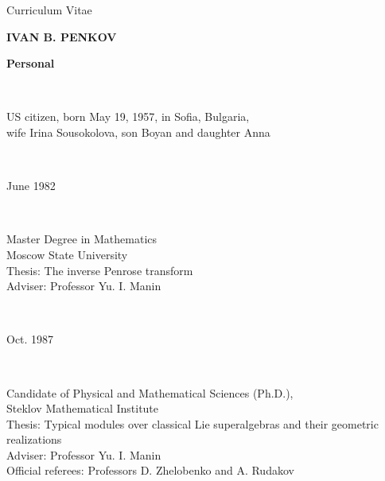 \documentclass[11pt]{amsart}
\newcommand{\thc}[2]{\noindent\parbox[t]{40mm}{#1}\
\parbox[t]{105mm}{#2}\\
}
\begin{document}
\begin{center}
Curriculum Vitae

\medskip

{\large{\bf IVAN B. PENKOV}}
\end{center}

\bigskip

\thc{\bf Personal}{US citizen, born May 19, 1957, in Sofia,
Bulgaria,\\ wife Irina Sousokolova, son Boyan and daughter Anna}

\medskip


\medskip

\thc{June 1982}{Master Degree in Mathematics\\
Moscow State University \\ Thesis:  The inverse Penrose
transform\\
Adviser:  Professor Yu. I. Manin\\}
\thc{Oct. 1987}{Candidate of Physical and Mathematical Sciences (Ph.D.),\\
Steklov Mathematical Institute\\
Thesis:  Typical modules over classical Lie superalgebras and their
geometric realizations\\
Adviser:  Professor Yu. I. Manin\\
Official referees:  Professors D. Zhelobenko and A. Rudakov}

\bigskip





\bigskip


\medskip
\end{document}
